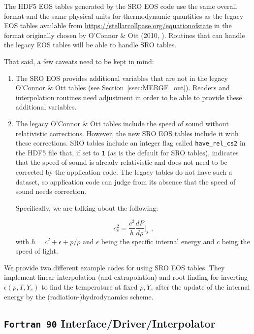 \documentclass[letterpaper,11pt]{refart}
\begin{document}
The HDF5 EOS tables generated by the SRO EOS code use the same overall
format and the same physical units for thermodynamic quantities as the
legacy EOS tables available from
\url{https://stellarcollpase.org/equationofstate} in the format
originally chosen by O'Connor \& Ott (2010,
\cite{oconnor:10}). Routines that can handle the legacy EOS tables
will be able to handle SRO tables.

That said, a few caveats need to be kept in mind:

\begin{enumerate}[label={(\arabic*)}]
\item The SRO EOS provides additional variables that are not in the
  legacy O'Connor \& Ott tables (see
  Section~\ref{ssec:MERGE_out}). Readers and interpolation routines
  need adjustment in order to be able to provide these additional
  variables.
  
\item The legacy O'Connor \& Ott tables include the speed of sound
  without relativistic corrections. However, the new SRO EOS tables
  include it with these corrections. SRO tables include an integer
  flag called \texttt{have\_rel\_cs2} in the HDF5 file that, if set to
  \texttt{1} (as is the default for SRO tables), indicates that the
  speed of sound is already relativistic and does not need to be
  corrected by the application code. The legacy tables do not have
  such a dataset, so application code can judge from its absence that
  the speed of sound needs correction.

  Specifically, we are talking about the following:

  \begin{equation}
    c_s^2 = \frac{c^2}{h} \frac{dP}{d\rho}\bigg|_s\,\,,
   \end{equation}
  with
  $h = c^2 + \epsilon + p/\rho$ and $\epsilon$ being the specific
  internal energy and $c$ being the speed of light.

\end{enumerate}


We provide two different example codes for using SRO EOS tables. They
implement linear interpolation (and extrapolation) and root finding
for inverting $\epsilon(\rho,T,Y_e)$ to find the temperature at fixed
$\rho, Y_e$ after the update of the internal energy by the
(radiation-)hydrodynamics scheme.

\subsection{\texttt{Fortran 90} Interface/Driver/Interpolator}
\end{document}
